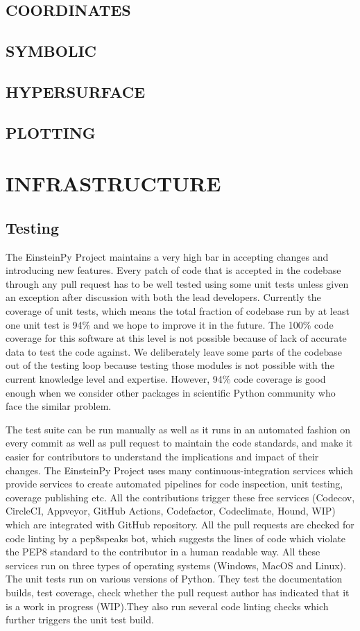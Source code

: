 \documentclass{aastex63}
\begin{document}
\subsection{COORDINATES}
\subsection{SYMBOLIC}
\subsection{HYPERSURFACE}
\subsection{PLOTTING}

\section{INFRASTRUCTURE} \label{sec:INFRASTRUCTURE}
\subsection{ Testing} \label{subsec: Testing}
The EinsteinPy Project maintains a very high bar in accepting changes and introducing new features. Every patch of code that is accepted in the codebase through any pull request has to be well tested using some unit tests unless given an exception after discussion with both the lead developers. Currently the coverage of unit tests, which means the total fraction of codebase run by at least one unit test is 94\% and we hope to improve it in the future. The 100\% code coverage for this software at this level is not possible because of lack of accurate data to test the code against. We deliberately leave some parts of the codebase out of the testing loop because testing those modules is not possible with the current knowledge level and expertise. However, 94\% code coverage is good enough when we consider other packages in scientific Python community who face the similar problem.  

The test suite can be run manually as well as it runs in an automated fashion on every commit as well as pull request to maintain the code standards, and make it easier for contributors to understand the implications and impact of their changes. The EinsteinPy Project uses many continuous-integration services which provide services to create automated pipelines for code inspection, unit testing, coverage publishing etc. All the contributions trigger these free services (Codecov, CircleCI, Appveyor, GitHub Actions, Codefactor, Codeclimate, Hound, WIP) which are integrated with GitHub repository. All the pull requests are checked for code linting by a pep8speaks bot, which suggests the lines of code which violate the PEP8 standard to the contributor in a human readable way. All these services run on three types of operating systems (Windows, MacOS and Linux). The unit tests run on various versions of Python. They test the documentation builds, test coverage, check whether the pull request author has indicated that it is a work in progress (WIP).They also run several code linting checks which further triggers the unit test build.
\end{document}
